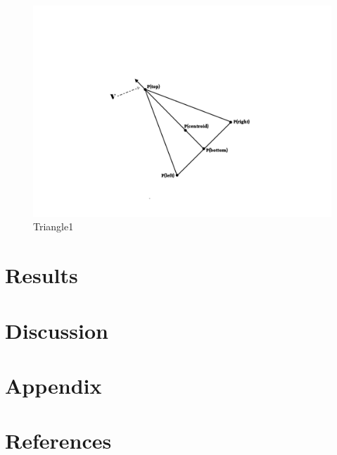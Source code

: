 \documentclass[paper=a4, fontsize=11pt,twoside]{scrartcl}		%
\begin{document}
\begin{flushleft}
\begin{figure}
\begin{center}
\includegraphics[scale=0.5]{Triangle1}
\caption{Triangle1}
\label{fig:triangle1}
\end{center}
\end{figure}

\section{Results}


\section{Discussion}


\section{Appendix}


\section{References}



\end{flushleft}
\end{document}
